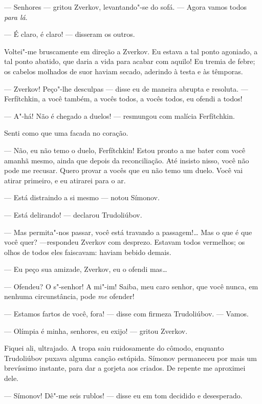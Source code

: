 --- Senhores --- gritou Zverkov, levantando"-se do sofá. --- Agora vamos todos
\textit{para lá}.

--- É claro, é claro! --- disseram os outros.

Voltei"-me bruscamente em direção a Zverkov. Eu estava a tal ponto
agoniado, a tal ponto abatido, que daria a vida para acabar com aquilo!
Eu tremia de febre; os cabelos molhados de suor haviam secado, aderindo
à testa e às têmporas.

--- Zverkov! Peço"-lhe desculpas --- disse eu de maneira abrupta e resoluta.
--- Ferfítchkin, a você também, a vocês todos, a vocês todos, eu ofendi a
todos!

--- A"-há! Não é chegado a duelos! --- resmungou com malícia Ferfítchkin.

Senti como que uma facada no coração.

--- Não, eu não temo o duelo, Ferfítchkin! Estou pronto a me bater com
você amanhã mesmo, ainda que depois da reconciliação. Até insisto
nisso, você não pode me recusar. Quero provar a vocês que eu não temo
um duelo. Você vai atirar primeiro, e eu atirarei para o ar.

--- Está distraindo a si mesmo --- notou Símonov.

--- Está delirando! --- declarou Trudoliúbov.

--- Mas permita"-nos passar, você está travando a passagem!\ldots{} Mas o que é
que você quer? ---respondeu Zverkov com desprezo. Estavam todos
vermelhos; os olhos de todos eles faiscavam: haviam bebido demais.

--- Eu peço sua amizade, Zverkov, eu o ofendi mas\ldots{}

--- Ofendeu? O s"-senhor! A mi"-im! Saiba, meu caro senhor, que você nunca,
em nenhuma circunstância, pode \textit{me} ofender!

--- Estamos fartos de você, fora! --- disse com firmeza Trudoliúbov. ---
Vamos.

--- Olímpia é minha, senhores, eu exijo! --- gritou Zverkov.


Fiquei ali, ultrajado. A tropa saiu ruidosamente do cômodo, enquanto
Trudoliúbov puxava alguma canção estúpida. Símonov permaneceu por mais
um brevíssimo instante, para dar a gorjeta aos criados. De repente me
aproximei dele.

--- Símonov! Dê"-me seis rublos! --- disse eu em tom decidido e desesperado.

